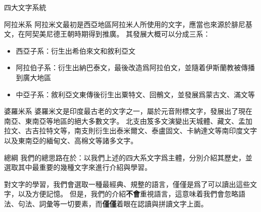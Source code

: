 \documentclass[aspectratio=169]{beamer}
\begin{document}
\begin{frame}{四大文字系統}
    \begin{block}{阿拉米系}
        阿拉米文最初是西亞地區阿拉米人所使用的文字，應當也來源於腓尼基文，在阿契美尼德王朝時期得到推廣。
        其發展大概可以分成三系：
        \begin{itemize}
            \item 西亞子系：衍生出希伯來文和敘利亞文
            \item 阿拉伯子系：衍生出納巴泰文，最後改造爲阿拉伯文，並隨着伊斯蘭教被傳播到廣大地區
            \item 中亞子系：敘利亞文東傳後衍生出粟特文、回鶻文，並發展爲蒙古文、滿文等
        \end{itemize}
    \end{block}

    \begin{block}{婆羅米系}
        婆羅米文是印度最古老的文字之一，屬於元音附標文字，發展出了現在南亞、東南亞等地區的絕大多數文字。
        北支由笈多文演變出天城體、藏文、孟加拉文、古吉拉特文等，南支則衍生出泰米爾文、泰盧固文、卡納達文等南印度文字以及東南亞的緬甸文、高棉文等諸多文字。
    \end{block}
\end{frame}

\begin{frame}{總綱}
    我們的總思路在於：以我們上述的四大系文字爲主體，分別介紹其歷史，並選取其中最重要的幾種文字來進行介紹與學習。

    對文字的學習，我們會選取一種最經典、規整的語言，僅僅是爲了可以讀出這些文字，以及方便記憶。
    但是，我們的介紹\textbf{不會}重視語言，這意味着我們會忽略語法、句法、詞彙等一切要素，而\textbf{僅僅}着眼在認讀與拼讀文字上面。
\end{frame}
\end{document}
